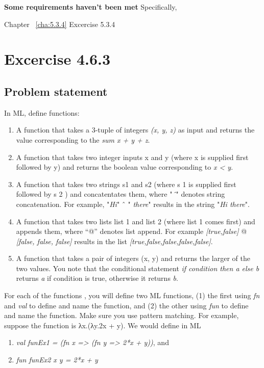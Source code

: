 \documentclass{report}
\begin{document}
\textbf{Some requirements haven't been met} Specifically,
\begin{description}
		\item Chapter ~\ref{cha:5.3.4} Excercise 5.3.4
		
\end{description}


\chapter{Excercise 4.6.3}
\label{cha:4.6.3}

\section{Problem statement}
\label{problem-statement-4.6.3}
In ML, define functions:
\begin{enumerate}
	\item A function that takes a 3-tuple of integers \emph{(x, y, z)} as input and returns the value corresponding to the \emph{sum x + y + z}.
\item A function that takes two integer inputs x and y (where x is supplied first followed by y) and returns the
boolean value corresponding to \emph{x < y}.
	\item A function that takes two strings s1 and s2 (where s 1 is supplied first followed by s 2 ) and concatentates them, where "\emph{ˆ}" denotes string concatenation. For example, "\emph{Hi}" ˆ " \emph{there}" results in the string "\emph{Hi there}".
	\item A function that takes two lists list 1 and list 2 (where list 1 comes first) and appends them, where “@”
denotes list append. For example \emph{[true,false]} @ \emph{[false, false, false]} results in the list \emph{[true,false,false,false,false]}.
	\item A function that takes a pair of integers (x, y) and returns the larger of the two values. You note that the
conditional statement \emph{if condition then a else b} returns \emph{a} if condition is true, otherwise it returns \emph{b}.
\end{enumerate} 
For each of the functions , you will define two ML functions, (1) the first using \emph{fn} and \emph{val} to define and name the function, and (2) the other using \emph{fun} to define and name the function. Make sure you use pattern matching.
	 For example, suppose the function is λx.(λy.2x + y). We would define in ML
\begin{enumerate}
\item \emph{val funEx1 = (fn x => (fn y => 2*x + y))}, and
\item \emph{fun funEx2 x y = 2*x + y}
\end{enumerate}
\end{document}
